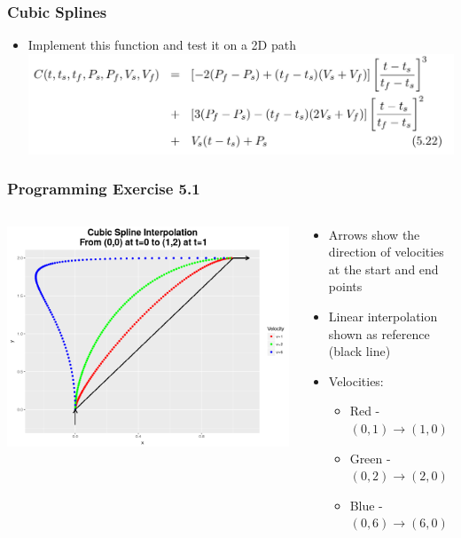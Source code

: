 \documentclass{beamer}
\begin{document}

\begin{frame}
  \frametitle{Cubic Splines}
  \begin{itemize}
  \item Implement this function and test it on a 2D path
  \includegraphics[width=\textwidth]{./cubic_spline_equation}
  \end{itemize}
\end{frame}


\begin{frame}
  \frametitle{Programming Exercise 5.1}
  \begin{columns}
    \begin{column}{0.6\textwidth}
      \includegraphics[width=\textwidth]{./cubic_spline}
    \end{column}
    \begin{column}{0.4\textwidth}
      \begin{itemize}
      \item Arrows show the direction of velocities at the start and end points
      \item Linear interpolation shown as reference (black line)
      \item Velocities:
        \begin{itemize}
          \item Red - $(0,1) \rightarrow (1,0)$
          \item Green - $(0,2) \rightarrow (2,0)$
          \item Blue - $(0,6) \rightarrow (6,0)$
        \end{itemize}
      \end{itemize}
    \end{column}
  \end{columns}
\end{frame}

\end{document}

